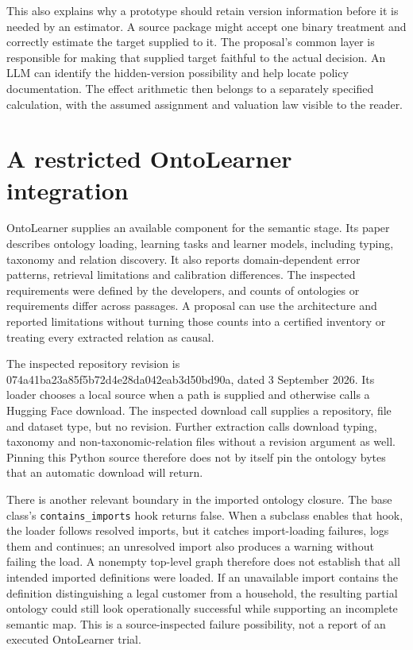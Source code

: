 This also explains why a prototype should retain version information
before it is needed by an estimator. A source package might accept one
binary treatment and correctly estimate the target supplied to it. The
proposal's common layer is responsible for making that supplied target
faithful to the actual decision. An LLM can identify the hidden-version
possibility and help locate policy documentation. The effect arithmetic
then belongs to a separately specified calculation, with the assumed
assignment and valuation law visible to the reader.

\hypertarget{a-restricted-ontolearner-integration}{%
\section{A restricted OntoLearner
integration}\label{a-restricted-ontolearner-integration}}

OntoLearner supplies an available component for the semantic stage. Its
paper describes ontology loading, learning tasks and learner models,
including typing, taxonomy and relation discovery. It also reports
domain-dependent error patterns, retrieval limitations and calibration
differences. The inspected requirements were defined by the developers,
and counts of ontologies or requirements differ across passages. A
proposal can use the architecture and reported limitations without
turning those counts into a certified inventory or treating every
extracted relation as causal. \citep{v12_la_2607_01977}

The inspected repository revision is
074a41ba23a85f5b72d4e28da042eab3d50bd90a, dated 3 September 2026. Its
loader chooses a local source when a path is supplied and otherwise
calls a Hugging Face download. The inspected download call supplies a
repository, file and dataset type, but no revision. Further extraction
calls download typing, taxonomy and non-taxonomic-relation files without
a revision argument as well. Pinning this Python source therefore does
not by itself pin the ontology bytes that an automatic download will
return. \citep{v12_la_package_ontolearner}

There is another relevant boundary in the imported ontology closure. The
base class's \texttt{contains\_imports} hook returns false. When a
subclass enables that hook, the loader follows resolved imports, but it
catches import-loading failures, logs them and continues; an unresolved
import also produces a warning without failing the load. A nonempty
top-level graph therefore does not establish that all intended imported
definitions were loaded. If an unavailable import contains the
definition distinguishing a legal customer from a household, the
resulting partial ontology could still look operationally successful
while supporting an incomplete semantic map. This is a source-inspected
failure possibility, not a report of an executed OntoLearner trial.
\citep{exec13_ontolearner_inspection}

